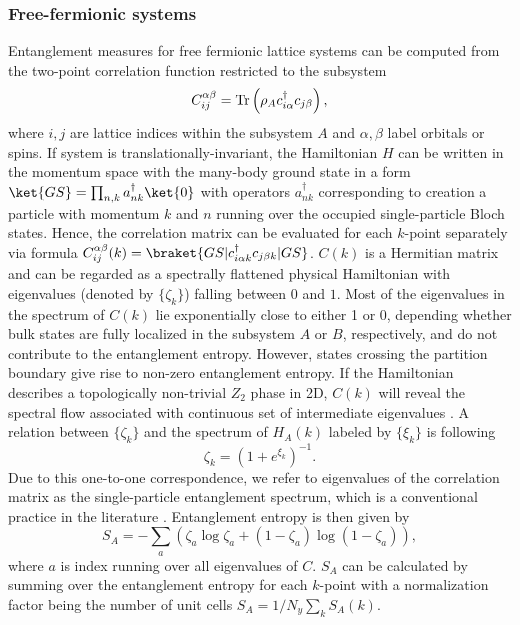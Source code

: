 \subsubsection{Free-fermionic systems}
Entanglement measures for free fermionic lattice systems can be computed from the two-point correlation function restricted to the subsystem \cite{Peschel}
\begin{equation}
C^{\alpha \beta}_{ij}= \textnormal{Tr} \left( \rho_A c^{\dagger}_{i\alpha} c_{j\beta} \right),
\end{equation}
where $i, j$ are lattice indices within the subsystem $A$ and $\alpha, \beta$ label orbitals or spins. If system is translationally-invariant, the Hamiltonian $H$ can be written in the momentum space with the many-body ground state in a form $\ket{GS} = \prod_{n, k}  a^{\dagger}_{n k} \ket{0}$ with operators $a^{\dagger}_{n k}$ corresponding to creation a particle with momentum $k$ and $n$ running over the occupied single-particle Bloch states. Hence, the correlation matrix can be evaluated for each $k$-point separately via formula $C^{\alpha \beta}_{ij} (k) = \braket{GS | c^{\dagger}_{i\alpha k} c_{j \beta k} | GS}$. $C(k)$ is a Hermitian matrix and can be regarded as a spectrally flattened physical Hamiltonian with eigenvalues (denoted by $\lbrace \zeta_k \rbrace$) falling between $0$ and $1$. Most of the eigenvalues in the spectrum of $C(k)$ lie exponentially close to either 1 or 0, depending whether bulk states are fully localized in the subsystem $A$ or $B$, respectively, and do not contribute to the entanglement entropy. However, states crossing the partition boundary give rise to non-zero entanglement entropy. If the Hamiltonian describes a topologically non-trivial $Z_2$ phase in 2D, $C(k)$ will reveal the spectral flow associated with continuous set of intermediate eigenvalues \cite{Hughes:inv, Vish:inv}. A relation between $\lbrace \zeta_k \rbrace$ and the spectrum of $H_A(k)$ labeled by $\lbrace \xi_k \rbrace$ is following
\begin{equation}
\zeta_k = \left( 1+e^{\xi_k} \right)^{-1}.
\end{equation}
Due to this one-to-one correspondence, we refer to eigenvalues of the correlation matrix as the single-particle entanglement spectrum, which is a conventional practice in the literature \cite{Alex:CM, Vish:inv, Hughes:inv}. Entanglement entropy is then given by
\begin{equation}
S_A = - \sum_a \left( \zeta_a \log \zeta_a + \left( 1 - \zeta_a \right) \log \left( 1 - \zeta_a \right) \right),
\label{eq:entCij}
\end{equation}
where $a$ is index running over all eigenvalues of $C$. $S_A$ can be calculated \cite{Ryu:EE} by summing over the entanglement entropy for each $k$-point with a normalization factor being the number of unit cells $S_{A} = 1 / N_y \sum_k S_A(k)$.

